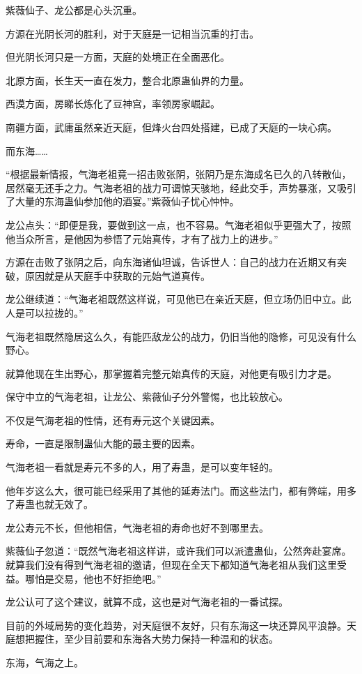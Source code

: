 \begin{this_body}
紫薇仙子、龙公都是心头沉重。

方源在光阴长河的胜利，对于天庭是一记相当沉重的打击。

但光阴长河只是一方面，天庭的处境正在全面恶化。

北原方面，长生天一直在发力，整合北原蛊仙界的力量。

西漠方面，房睇长炼化了豆神宫，率领房家崛起。

南疆方面，武庸虽然亲近天庭，但烽火台四处搭建，已成了天庭的一块心病。

而东海……

“根据最新情报，气海老祖竟一招击败张阴，张阴乃是东海成名已久的八转散仙，居然毫无还手之力。气海老祖的战力可谓惊天骇地，经此交手，声势暴涨，又吸引了大量的东海蛊仙参加他的酒宴。”紫薇仙子忧心忡忡。

龙公点头：“即便是我，要做到这一点，也不容易。气海老祖似乎更强大了，按照他当众所言，是他因为参悟了元始真传，才有了战力上的进步。”

方源在击败了张阴之后，向东海诸仙坦诚，告诉世人：自己的战力在近期又有突破，原因就是从天庭手中获取的元始气道真传。

龙公继续道：“气海老祖既然这样说，可见他已在亲近天庭，但立场仍旧中立。此人是可以拉拢的。”

气海老祖既然隐居这么久，有能匹敌龙公的战力，仍旧当他的隐修，可见没有什么野心。

就算他现在生出野心，那掌握着完整元始真传的天庭，对他更有吸引力才是。

保守中立的气海老祖，让龙公、紫薇仙子分外警惕，也比较放心。

不仅是气海老祖的性情，还有寿元这个关键因素。

寿命，一直是限制蛊仙大能的最主要的因素。

气海老祖一看就是寿元不多的人，用了寿蛊，是可以变年轻的。

他年岁这么大，很可能已经采用了其他的延寿法门。而这些法门，都有弊端，用多了寿蛊也就无效了。

龙公寿元不长，但他相信，气海老祖的寿命也好不到哪里去。

紫薇仙子忽道：“既然气海老祖这样讲，或许我们可以派遣蛊仙，公然奔赴宴席。就算我们没有得到气海老祖的邀请，但现在全天下都知道气海老祖从我们这里受益。哪怕是交易，他也不好拒绝吧。”

龙公认可了这个建议，就算不成，这也是对气海老祖的一番试探。

目前的外域局势的变化趋势，对天庭很不友好，只有东海这一块还算风平浪静。天庭想把握住，至少目前要和东海各大势力保持一种温和的状态。

东海，气海之上。


\end{this_body}
